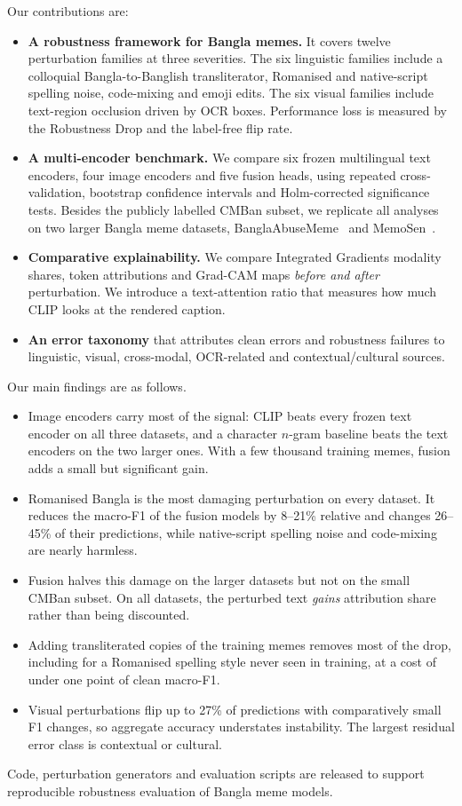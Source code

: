 Our contributions are:
\begin{itemize}
  \item \textbf{A robustness framework for Bangla memes.} It covers twelve perturbation families at three
  severities. The six linguistic families include a colloquial Bangla-to-Banglish transliterator, Romanised and
  native-script spelling noise, code-mixing and emoji edits. The six visual families include text-region
  occlusion driven by OCR boxes. Performance loss is measured by the Robustness Drop and the label-free flip rate.

  \item \textbf{A multi-encoder benchmark.} We compare six frozen multilingual text encoders, four image encoders
  and five fusion heads, using repeated cross-validation, bootstrap confidence intervals and Holm-corrected
  significance tests. Besides the publicly labelled CMBan subset, we replicate all analyses on two larger Bangla
  meme datasets, BanglaAbuseMeme~\cite{das2023banglaabusememe} and MemoSen~\cite{hossain2022memosen}.

  \item \textbf{Comparative explainability.} We compare Integrated Gradients modality shares, token attributions
  and Grad-CAM maps \emph{before and after} perturbation. We introduce a text-attention ratio that measures how
  much CLIP looks at the rendered caption.

  \item \textbf{An error taxonomy} that attributes clean errors and robustness failures to linguistic, visual,
  cross-modal, OCR-related and contextual/cultural sources.
\end{itemize}

Our main findings are as follows.
\begin{itemize}
  \item Image encoders carry most of the signal: CLIP beats every frozen text encoder on all three datasets, and a
  character $n$-gram baseline beats the text encoders on the two larger ones. With a few thousand training memes,
  fusion adds a small but significant gain.
  \item Romanised Bangla is the most damaging perturbation on every dataset. It reduces the macro-F1 of the fusion
  models by 8--21\% relative and changes 26--45\% of their predictions, while native-script spelling noise and
  code-mixing are nearly harmless.
  \item Fusion halves this damage on the larger datasets but not on the small CMBan subset. On all datasets, the
  perturbed text \emph{gains} attribution share rather than being discounted.
  \item Adding transliterated copies of the training memes removes most of the drop, including for a Romanised
  spelling style never seen in training, at a cost of under one point of clean macro-F1.
  \item Visual perturbations flip up to 27\% of predictions with comparatively small F1 changes, so aggregate
  accuracy understates instability. The largest residual error class is contextual or cultural.
\end{itemize}
Code, perturbation generators and evaluation scripts are released to support reproducible robustness evaluation of
Bangla meme models.
